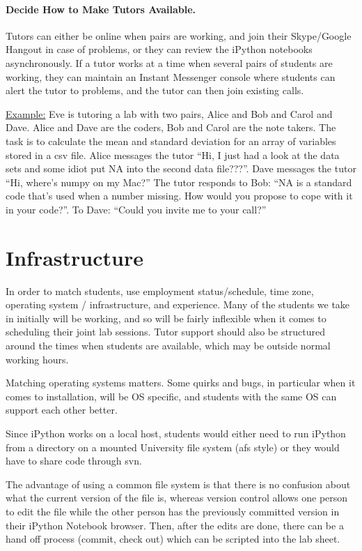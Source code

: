 \documentclass[11pt,a4paper]{article}
\begin{document}
\paragraph{Decide How to Make Tutors Available.} Tutors can either be online when pairs are working, and join their Skype/Google Hangout in case of problems, or they can review the iPython notebooks asynchronously. If a tutor works at a time when several pairs of students are working, they can maintain an Instant Messenger console where students can alert the tutor to problems, and the tutor can then join existing calls. 

\underline{Example:} Eve is tutoring a lab with two pairs, Alice and Bob and Carol and Dave. Alice and Dave are the coders, Bob and Carol are the note takers. The task is to calculate the mean and standard deviation for an array of variables stored in a csv file. Alice messages the tutor ``Hi, I just had a look at the data sets and some idiot put NA into the second data file???''. Dave messages the tutor ``Hi, where's numpy on my Mac?'' The tutor responds to Bob: ``NA is a standard code that's used when a number missing. How would you propose to cope with it in your code?''. To Dave: ``Could you invite me to your call?''


\section{Infrastructure}

In order to match students, use employment status/schedule, time zone, operating system / infrastructure, and experience. Many of the students we take in initially will be working, and so will be fairly inflexible when it comes to scheduling their joint lab sessions. Tutor support should also be structured around the times when students are available, which may be outside normal working hours. 

Matching operating systems matters. Some quirks and bugs, in particular when it comes to installation, will be OS specific, and students with the same OS can support each other better.  

Since iPython works on a local host, students would either need to run iPython from a directory on a mounted University file system (afs style) or they would have to share code through svn. 

The advantage of using a common file system is that there is no confusion about what the current version of the file is, whereas version control allows one person to edit the file while the other person has the previously committed version in their iPython Notebook browser. Then, after the edits are done, there can be a hand off process (commit, check out) which can be scripted into the lab sheet. 
\end{document}
